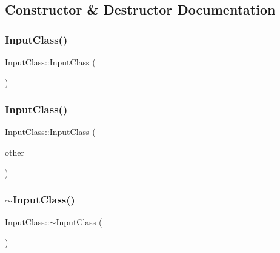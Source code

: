 \subsection{Constructor \& Destructor Documentation}
\mbox{\label{class_input_class_a5bdb6c4005f53a1e7da0cf5d520c96c1}} 
\subsubsection{\texorpdfstring{Input\+Class()}{InputClass()}\hspace{0.1cm}{\footnotesize\ttfamily [1/2]}}
{\footnotesize\ttfamily Input\+Class\+::\+Input\+Class (\begin{DoxyParamCaption}{ }\end{DoxyParamCaption})}

\mbox{\label{class_input_class_a90666acaee782bd2f19f09053d3a4f8b}} 
\subsubsection{\texorpdfstring{Input\+Class()}{InputClass()}\hspace{0.1cm}{\footnotesize\ttfamily [2/2]}}
{\footnotesize\ttfamily Input\+Class\+::\+Input\+Class (\begin{DoxyParamCaption}\item[{const \hyperlink{class_input_class}{Input\+Class} \&}]{other }\end{DoxyParamCaption})}

\mbox{\label{class_input_class_a861f917dd9d8148175570da894131c14}} 
\subsubsection{\texorpdfstring{$\sim$\+Input\+Class()}{~InputClass()}}
{\footnotesize\ttfamily Input\+Class\+::$\sim$\+Input\+Class (\begin{DoxyParamCaption}{ }\end{DoxyParamCaption})}



